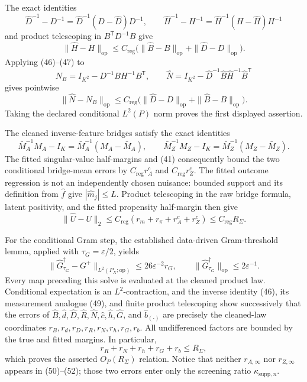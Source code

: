 The exact identities
\[
 \widehat D^{-1}-D^{-1}=\widehat D^{-1}(D-\widehat D)D^{-1},
 \qquad
 \widehat H^{-1}-H^{-1}=\widehat H^{-1}(H-\widehat H)H^{-1}      \tag{46}
\]
and product telescoping in \(B^{\mathsf T}D^{-1}B\) give
\[
 \|\widehat H-H\|_{\mathrm{op}}
 \leq C_{\mathrm{reg}}
 \bigl(\|\widehat B-B\|_{\mathrm{op}}+\|\widehat D-D\|_{\mathrm{op}}\bigr). \tag{47}
\]
Applying (46)--(47) to
\[
 N_B=I_{K^2}-D^{-1}BH^{-1}B^{\mathsf T},
 \qquad
 \widehat N=I_{K^2}-\widehat D^{-1}\widehat B\widehat H^{-1}\widehat B^{\mathsf T}
\]
gives pointwise
\[
 \|\widehat N-N_B\|_{\mathrm{op}}
 \leq C_{\mathrm{reg}}
 \bigl(\|\widehat D-D\|_{\mathrm{op}}+\|\widehat B-B\|_{\mathrm{op}}\bigr). \tag{48}
\]
Taking the declared conditional \(L^2(P)\) norm proves the first displayed assertion.

The cleaned inverse-feature bridges satisfy the exact identities
\[
 \bar M_A^{-1}M_A-I_K=\bar M_A^{-1}(M_A-\bar M_A),
 \qquad
 \bar M_Z^{-1}M_Z-I_K=\bar M_Z^{-1}(M_Z-\bar M_Z).               \tag{49}
\]
The fitted singular-value half-margins and (41) consequently bound the two conditional bridge-mean errors by \(C_{\mathrm{reg}}r_A^c\) and \(C_{\mathrm{reg}}r_Z^c\).  The fitted outcome regression is not an independently chosen nuisance: bounded support and its definition from \(\widehat f\) give \(|\widehat m_j|\leq L\).  Product telescoping in the raw bridge formula, latent positivity, and the fitted propensity half-margin then give
\[
 \|\widehat U-U\|_2
 \leq C_{\mathrm{reg}}(r_m+r_\pi+r_A^c+r_Z^c)
 \leq C_{\mathrm{reg}}R_\Sigma.                                \tag{50}
\]

For the conditional Gram step, the established data-driven Gram-threshold lemma, applied with \(\tau_G=\varepsilon/2\), yields
\[
 \|\widehat G_{\tau_G}^{\dagger}-G^+\|_{L^2(P_X;\mathrm{op})}
 \leq26\varepsilon^{-2}r_G,
 \qquad
 \|\widehat G_{\tau_G}^{\dagger}\|_{\mathrm{op}}
 \leq2\varepsilon^{-1}.                                        \tag{51}
\]
Every map preceding this solve is evaluated at the cleaned product law.  Conditional expectation is an \(L^2\)-contraction, and the inverse identity (46), its measurement analogue (49), and finite product telescoping show successively that the errors of \(\widehat B,\widehat d,\widehat D,\widehat R,\widehat N,\widehat c,\widehat h,\widehat G\), and \(\widehat b_{(\cdot)}\) are precisely the cleaned-law coordinates \(r_B,r_d,r_D,r_R,r_N,r_h,r_G,r_b\).  All undifferenced factors are bounded by the true and fitted margins.  In particular,
\[
 r_R+r_N+r_h+r_G+r_b\leq R_\Sigma,                              \tag{52}
\]
which proves the asserted \(O_P(R_\Sigma)\) relation.  Notice that neither \(r_{A,\infty}\) nor \(r_{Z,\infty}\) appears in (50)--(52); those two errors enter only the screening ratio \(\kappa_{\mathrm{supp},n}\).

